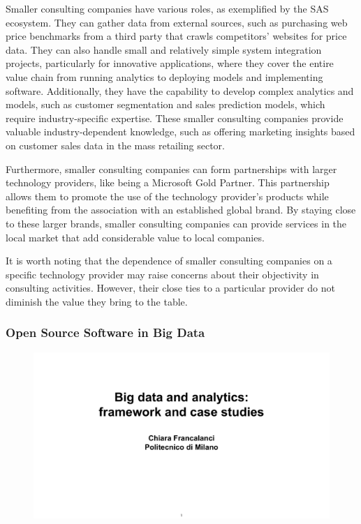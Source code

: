 Smaller consulting companies have various roles, as exemplified by the
SAS ecosystem. They can gather data from external sources, such as
purchasing web price benchmarks from a third party that crawls
competitors' websites for price data. They can also handle small and
relatively simple system integration projects, particularly for
innovative applications, where they cover the entire value chain from
running analytics to deploying models and implementing software.
Additionally, they have the capability to develop complex analytics and
models, such as customer segmentation and sales prediction models, which
require industry-specific expertise. These smaller consulting companies
provide valuable industry-dependent knowledge, such as offering
marketing insights based on customer sales data in the mass retailing
sector.

Furthermore, smaller consulting companies can form partnerships with
larger technology providers, like being a Microsoft Gold Partner. This
partnership allows them to promote the use of the technology provider's
products while benefiting from the association with an established
global brand. By staying close to these larger brands, smaller
consulting companies can provide services in the local market that add
considerable value to local companies.

It is worth noting that the dependence of smaller consulting companies
on a specific technology provider may raise concerns about their
objectivity in consulting activities. However, their close ties to a
particular provider do not diminish the value they bring to the table.

\subsubsection{Open Source Software in Big Data}

\begin{figure}[!h]
    \centering
    \includegraphics[page=62, trim = 1cm 5cm 1cm 4.5cm, clip, width=\textwidth]{images/06 - BIG_DATA.pdf}
\end{figure}

